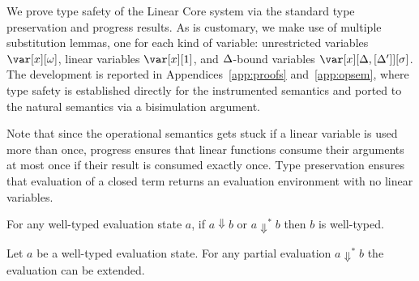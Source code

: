 \documentclass[acmsmall,review,screen]{acmart}
\begin{document}

We prove type safety of the Linear Core system via the standard type
preservation and progress results. As is customary, we make use of multiple
substitution lemmas, one for each kind of variable: unrestricted variables
$\xo$, linear variables $\xl$, and $\Delta$-bound variables $\xD$. The
development is reported in Appendices~\ref{app:proofs}
and~\ref{app:opsem}, where type safety is established directly for the
instrumented semantics and ported to the natural semantics via a
bisimulation argument.

Note that since the operational semantics gets stuck if a linear
variable is used more than once, progress ensures that linear
functions consume their arguments at most once if their result is
consumed exactly once. Type preservation ensures that evaluation of a
closed term returns an evaluation environment with no linear variables.

  \begin{theorem}
    For any well-typed evaluation state $a$, if $a \Downarrow
    b$ or $a \Downarrow^* b$ then $b$ is well-typed.
  \end{theorem}

  
  
\begin{theorem}[Progress]
Let $a$ be a well-typed evaluation state. For any partial evaluation $a \Downarrow^* b$ 
the evaluation can be extended.
\end{theorem}
\end{document}
